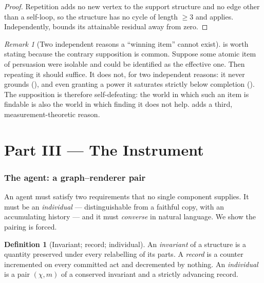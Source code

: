 \documentclass[11pt,a4paper]{article}
\theoremstyle{clstyle}
\theoremstyle{definition}
\newtheorem{definition}[theorem]{Definition}
\theoremstyle{remark}
\newtheorem{remark}[theorem]{Remark}
\newcommand{\Char}{\chi}
\newcommand{\rec}{m}
\begin{document}
\begin{proof}
Repetition adds no new vertex to the support structure and no edge other
than a self-loop, so the structure has no cycle of length $\ge3$ and
 applies. Independently,  bounds its
attainable residual away from zero.
\end{proof}

\begin{remark}[Two independent reasons a ``winning item'' cannot exist]
\label{rem:no-winning-item}
 is worth stating because the contrary supposition
is common. Suppose some atomic item of persuasion were isolable and could be
identified as the effective one. Then repeating it should suffice. It does
not, for two independent reasons: it never grounds (), and
even granting a power it saturates strictly below completion
(). The supposition is therefore
self-defeating: the world in which such an item is findable is also the world
in which finding it does not help.  adds a third,
measurement-theoretic reason.
\end{remark}

\part*{Part III --- The Instrument}

\section{The agent: a graph--renderer pair}
\label{sec:agent}

An agent must satisfy two requirements that no single component supplies. It
must be an \emph{individual} --- distinguishable from a faithful copy, with
an accumulating history --- and it must \emph{converse} in natural language.
We show the pairing is forced.

\begin{definition}[Invariant; record; individual]
\label{def:individual}
An \emph{invariant} of a structure is a quantity preserved under every
relabelling of its parts. A \emph{record} is a counter incremented on every
committed act and decremented by nothing. An \emph{individual} is a pair
$(\Char,\rec)$ of a conserved invariant and a strictly advancing record.
\end{definition}
\end{document}
